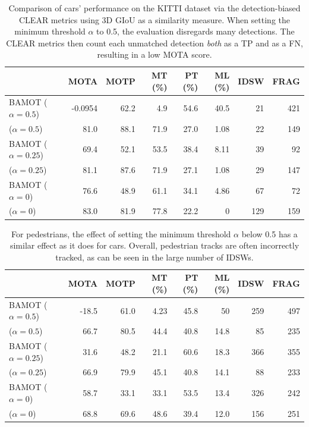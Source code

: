 \documentclass[headsepline, hidelinks, footsepline, footinclude=false, oneside, fontsize=11pt, paper=a4, listof=totoc, bibliography=totoc]{scrbook}
\begin{document}
\begin{table}
\centering
{} {

\begin{tabular}{lrrrrrrr}
 & MOTA & MOTP & MT (\%) & PT (\%) & ML (\%) & IDSW & FRAG\\
\hline
BAMOT  (\(\alpha=0.5\)) & -0.0954 & 62.2 & 4.9 & 54.6 & 40.5 & 21 & 421\\
\cite{wengBaseline3DMultiObject2019} (\(\alpha=0.5\)) & 81.0 & 88.1 & 71.9 & 27.0 & 1.08 & 22 & 149\\
\hline
BAMOT  (\(\alpha=0.25\)) & 69.4 & 52.1 & 53.5 & 38.4 & 8.11 & 39 & 92\\
\cite{wengBaseline3DMultiObject2019} (\(\alpha=0.25\)) & 81.1 & 87.6 & 71.9 & 27.1 & 1.08 & 29 & 147\\
\hline
BAMOT  (\(\alpha=0\)) & 76.6 & 48.9 & 61.1 & 34.1 & 4.86 & 67 & 72\\
\cite{wengBaseline3DMultiObject2019} (\(\alpha=0\)) & 83.0 & 81.9 & 77.8 & 22.2 & 0 & 129 & 159\\
\end{tabular}

}
\caption{ Comparison of cars' performance on the KITTI dataset via the detection-biased CLEAR metrics using 3D GIoU as a similarity measure.
When setting the minimum threshold $\alpha$ to 0.5, the evaluation disregards many detections. The CLEAR metrics then count each unmatched detection \emph{both} as a TP and as a FN, resulting in a low MOTA score.}
\label{tab:clear-car}
\end{table}

\begin{table}
\centering
{} {

\begin{tabular}{lrrrrrrr}
 & MOTA & MOTP & MT (\%) & PT (\%) & ML (\%) & IDSW & FRAG\\
\hline
BAMOT  (\(\alpha=0.5\)) & -18.5 & 61.0 & 4.23 & 45.8 & 50 & 259 & 497\\
\cite{wengBaseline3DMultiObject2019} (\(\alpha=0.5\)) & 66.7 & 80.5 & 44.4 & 40.8 & 14.8 & 85 & 235\\
\hline
BAMOT  (\(\alpha=0.25\)) & 31.6 & 48.2 & 21.1 & 60.6 & 18.3 & 366 & 355\\
\cite{wengBaseline3DMultiObject2019} (\(\alpha=0.25\)) & 66.9 & 79.9 & 45.1 & 40.8 & 14.1 & 88 & 233\\
\hline
BAMOT  (\(\alpha=0\)) & 58.7 & 33.1 & 33.1 & 53.5 & 13.4 & 326 & 242\\
\cite{wengBaseline3DMultiObject2019} (\(\alpha=0\)) & 68.8 & 69.6 & 48.6 & 39.4 & 12.0 & 156 & 251\\
\end{tabular}

}
\caption{For pedestrians, the effect of setting the minimum threshold $\alpha$ below 0.5 has a similar effect as it does for cars.
Overall, pedestrian tracks are often incorrectly tracked, as can be seen in the large number of IDSWs.}
\label{tab:clear-ped}
\end{table}
\end{document}
